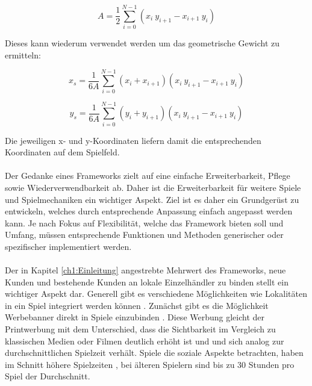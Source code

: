 \begin{equation}
A = \frac{1}{2}\sum_{i=0}^{N-1} (x_i\ y_{i+1} - x_{i+1}\ y_i)
\end{equation}

Dieses kann wiederum verwendet werden um das geometrische Gewicht zu ermitteln:

\begin{equation}
x_s = \frac{1}{6A}\sum_{i=0}^{N-1}(x_i+x_{i+1})(x_i\ y_{i+1} - x_{i+1}\ y_i)
\end{equation}

\begin{equation}
y_s = \frac{1}{6A}\sum_{i=0}^{N-1}(y_i+y_{i+1})(x_i\ y_{i+1} - x_{i+1}\ y_i)
\end{equation}

Die jeweiligen x- und y-Koordinaten liefern damit die entsprechenden Koordinaten auf dem Spielfeld.
\\\\
Der Gedanke eines Frameworks zielt auf eine einfache Erweiterbarkeit, Pflege sowie Wiederverwendbarkeit ab. Daher ist die Erweiterbarkeit für weitere Spiele und Spielmechaniken ein wichtiger Aspekt. Ziel ist es daher ein Grundgerüst zu entwickeln, welches durch entsprechende Anpassung einfach angepasst werden kann.
Je nach Fokus auf Flexibilität, welche das Framework bieten soll und Umfang, müssen entsprechende Funktionen und Methoden generischer oder spezifischer implementiert werden.
\\\\
Der in Kapitel \ref{ch1:Einleitung} angestrebte Mehrwert des Frameworks, neue Kunden und bestehende Kunden an lokale Einzelhändler zu binden stellt ein wichtiger Aspekt dar. Generell gibt es verschiedene Möglichkeiten wie Lokalitäten in ein Spiel integriert werden können \cite{Nelson.2002}.
Zunächst gibt es die Möglichkeit Werbebanner direkt in Spiele einzubinden \cite{Nelson.2004}. Diese Werbung gleicht der Printwerbung mit dem Unterschied, dass die Sichtbarkeit im Vergleich zu klassischen Medien oder Filmen deutlich erhöht ist und und sich analog zur durchschnittlichen Spielzeit verhält. Spiele die soziale Aspekte betrachten, haben im Schnitt höhere Spielzeiten \cite{Ducheneaut.2006}, bei älteren Spielern sind bis zu 30 Stunden pro Spiel der Durchschnitt.

